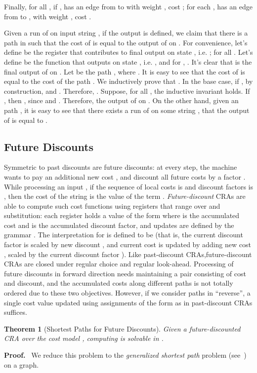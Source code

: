 \documentclass[11pt]{article}
\newtheorem{theorem}{Theorem}
\def\Proof{{\bf Proof.}}
\def\qed{{\bf }}
\newcommand{\mypar}[1]{\subsection{#1}}
\def\qed{{\bf }}
\begin{document}
Finally,
for all , if ,  has
an edge  from  to  with weight , cost ;
for each ,  has an edge  from  to ,  with weight , cost .

Given a run  of  on input string , if the output is defined,
we claim that there is a  path  in  such that the cost of  is equal to the output of  on .
For convenience, let's define  be the register that contributes to final output on state ,
i.e. ;  for all .
Let's define  be the function that outputs on state , i.e. ,
and for , .
It's clear that  is the final output of  on .
Let  be the path , where . It is easy to see that the cost of 
is equal to the cost of the path .
We inductively prove that .
In the base case, if , by construction,  and .
Therefore, .
Suppose, for all , the inductive invariant holds.
If , then
, since  and .
Therefore, the output of  on  .
On the other hand, given an  path ,  it is easy to see that there exists a run   of  on some string , that the output of  is equal to .
\qed

\mypar{Future Discounts} Symmetric to past discounts are future
discounts: at every step, the machine wants to pay an additional new
cost , and discount all future costs by a factor . While
processing an input , if the sequence of local costs
is  and discount factors is , then
the cost of the string is the value of the term . {\em Future-discount} CRAs are able to compute
such cost functions using registers that range over 
and substitution: each register holds a value of the form 
where  is the accumulated cost and  is the accumulated
discount factor, and updates are defined by the grammar . The interpretation for  is defined to be
 (that is, the current discount factor  is
scaled by new discount , and current cost  is updated by
adding new cost , scaled by the current discount factor ).
Like past-discount CRAs,future-discount CRAs are closed under
regular choice and regular look-ahead. Processing of future
discounts in forward direction needs maintaining a pair consisting
of cost and discount, and the accumulated costs along different
paths is not totally ordered due to these two objectives. However,
if we consider paths in ``reverse'', a single cost value updated
using assignments of the form  as in past-discount CRAs
suffices.


\begin{theorem}[Shortest Paths for Future Discounts]
Given a future-discounted CRA  over the cost model
, computing  is
solvable in .
\end{theorem}
\Proof~
We reduce this problem to the {\em generalized shortest path\/} problem
(see~\cite{batagelj_generalized_2000,oldham_combinatorial_1999}) on a graph.
\end{document}
